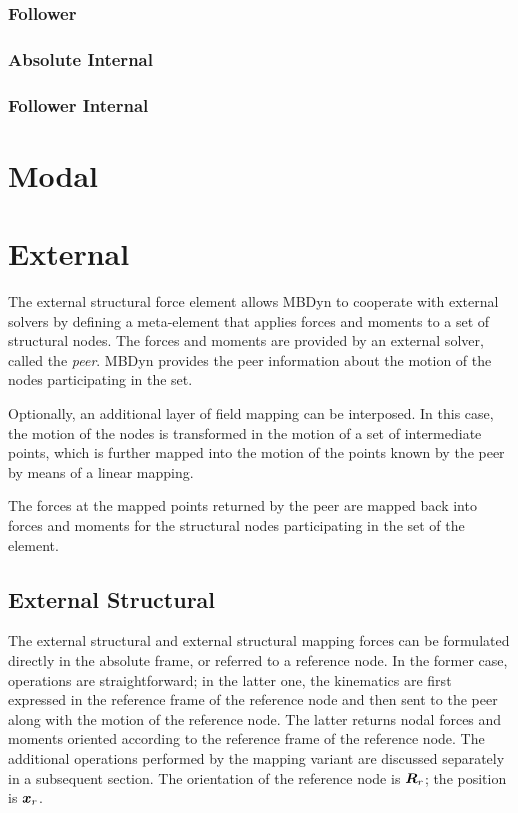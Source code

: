 \subsubsection{Follower}

\subsubsection{Absolute Internal}

\subsubsection{Follower Internal}

\section{Modal}

\section{External}
The external structural force element allows MBDyn
to cooperate with external solvers by defining a meta-element
that applies forces and moments to a set of structural nodes.
The forces and moments are provided by an external solver,
called the \emph{peer}.
MBDyn provides the peer information about the motion of the nodes
participating in the set.

Optionally, an additional layer of field mapping can be interposed.
In this case, the motion of the nodes is transformed in the motion
of a set of intermediate points, which is further mapped
into the motion of the points known by the peer by means
of a linear mapping.

The forces at the mapped points returned by the peer
are mapped back into forces and moments for the structural nodes
participating in the set of the element.

\subsection{External Structural}
The external structural and external structural mapping forces
can be formulated directly in the absolute frame, or referred
to a reference node.
In the former case, operations are straightforward;
in the latter one, the kinematics are first expressed
in the reference frame of the reference node and then sent
to the peer along with the motion of the reference node.
The latter returns nodal forces and moments oriented according
to the reference frame of the reference node.
The additional operations performed by the mapping variant
are discussed separately in a subsequent section.
The orientation of the reference node is $\bm{R}_r$;
the position is $\bm{x}_r$.

